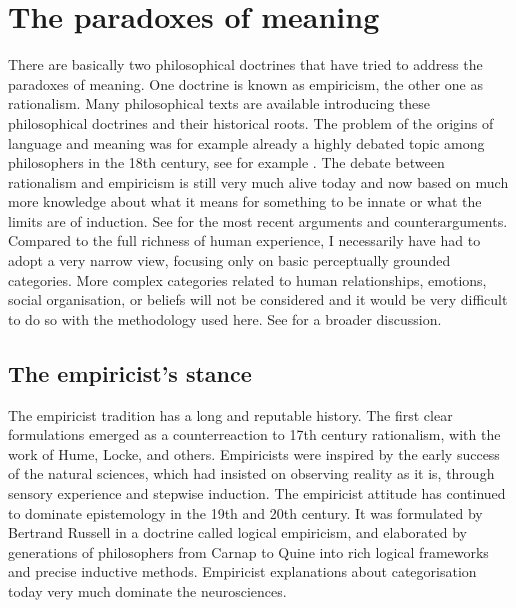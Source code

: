 \section{The paradoxes of meaning}

There are basically two philosophical doctrines that 
have tried to address the paradoxes of meaning. 
One doctrine is known as empiricism, the other one as 
rationalism.
Many philosophical texts are available introducing these
philosophical doctrines and their historical roots. 
The problem of the origins of language and meaning
was for example already a highly debated topic among philosophers in the 18th 
century, see for example \cite{Rousseau:1781}.
\newline
The debate between rationalism and empiricism
is still very much alive today and now based
on much more knowledge about what it means for 
something to be innate or what the limits are of
induction. See \cite{Elman:1998}
for the most recent arguments and counterarguments. Compared
to the full richness of human experience, I necessarily 
have had to adopt a very narrow view, focusing only on
basic perceptually grounded categories. More complex
categories related to human relationships, emotions, 
social organisation, or beliefs will not be 
considered and it would be very difficult to do so 
with the methodology used here. See \cite{Varela:1991}
for a broader discussion.
\subsection{The empiricist's stance}

The empiricist tradition has a long and reputable
history. The first clear formulations emerged as a 
counterreaction to 17th century rationalism, with the work of 
Hume, Locke, and others. Empiricists
were inspired by the early success 
of the natural sciences, which had insisted on observing reality
as it is, through sensory experience and stepwise induction. 
The empiricist attitude has continued to dominate epistemology
in the 19th and 20th century. It was formulated by Bertrand
Russell in a doctrine called logical empiricism, and 
elaborated by generations of philosophers from Carnap to Quine
into rich logical frameworks and precise inductive methods. 
Empiricist explanations about categorisation today very much
dominate the neurosciences. 

